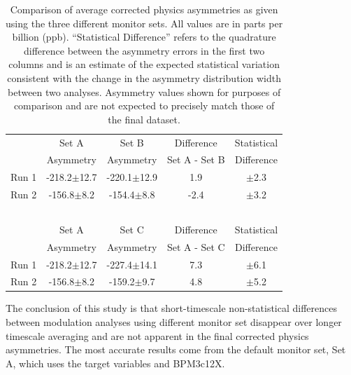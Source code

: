 \begin{table}[!h]
\caption{\label{tab:physics_diff_mon_sets}Comparison of average corrected physics asymmetries as given using the three different monitor sets. All values are in parts per billion (ppb). ``Statistical Difference'' refers to the quadrature difference between the asymmetry errors in the first two columns and is an estimate of the expected statistical variation consistent with the change in the asymmetry distribution width between two analyses. Asymmetry values shown for purposes of comparison and are not expected to precisely match those of the final \Qs dataset.  }
\begin{center}
\begin{tabular}[h]{|l|c|c|c|c|}\hline
~&Set A&Set B & Difference & Statistical \\ 
~&Asymmetry&Asymmetry&Set A - Set B&Difference\\ \hline
Run 1 & -218.2$\pm$12.7 & -220.1$\pm$12.9 & 1.9 &  $\pm$2.3 \\ \hline
Run 2 & -156.8$\pm$8.2  & -154.4$\pm$8.8&-2.4   & $\pm$3.2 \\ \hline
~&~&~&~&~\\
~&Set A&Set C & Difference & Statistical \\ 
~&Asymmetry&Asymmetry&Set A - Set C&Difference\\ \hline
Run 1 & -218.2$\pm$12.7 & -227.4$\pm$14.1 & 7.3 & $\pm$6.1\\ \hline
Run 2 & -156.8$\pm$8.2  & -159.2$\pm$9.7  & 4.8 & $\pm$5.2\\ \hline
\end{tabular}
\end{center}
\end{table}

The conclusion of this study is that short-timescale non-statistical differences between modulation analyses using different monitor set disappear over longer timescale averaging and are not apparent in the final corrected physics asymmetries. The most accurate results come from the default monitor set, Set A, which uses the target variables and BPM3c12X. 


